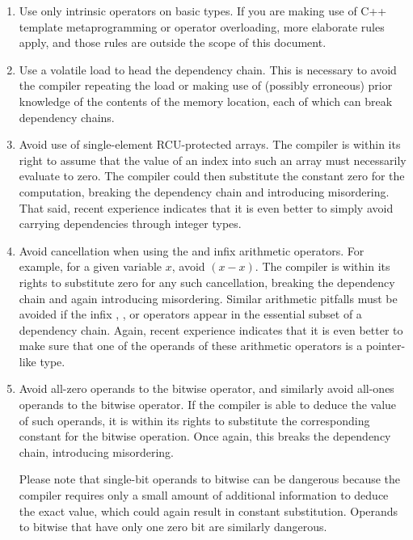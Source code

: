 \documentclass[letterpaper,twocolumn,10pt]{article}
\begin{document}
\begin{enumerate}
\item	Use only intrinsic operators on basic types.
	If you are making use of C++ template metaprogramming or
	operator overloading, more elaborate rules apply, and those
	rules are outside the scope of this document.
\item	Use a volatile load to head the dependency chain.
	This is necessary to avoid the compiler repeating
	the load or making use of (possibly erroneous) prior
	knowledge of the contents of the memory location,
	each of which can break dependency chains.
\item	Avoid use of single-element RCU-protected arrays.
	The compiler is within its right to assume that the
	value of an index into such an array must necessarily evaluate
	to zero.
	The compiler could then substitute the constant zero for
	the computation, breaking the dependency chain and introducing
	misordering.
	That said, recent experience indicates that it is even better
	to simply avoid carrying dependencies through integer types.
\item	Avoid cancellation when using the \co{+} and \co{-} infix
	arithmetic operators.
	For example, for a given variable $x$, avoid $(x-x)$.
	The compiler is within its rights to substitute zero for any
	such cancellation, breaking the dependency chain and again
	introducing misordering.
	Similar arithmetic pitfalls must be avoided if the
	infix \co{*}, \co{/}, or \co{\%} operators appear in
	the essential subset of a dependency chain.
	Again, recent experience indicates that it is even better
	to make sure that one of the operands of these arithmetic
	operators is a pointer-like type.
\item	Avoid all-zero operands to the bitwise \co{&} operator, and similarly
	avoid all-ones operands to the bitwise \co{|} operator.
	If the compiler is able to deduce the value of such operands,
	it is within its rights to substitute the corresponding constant
	for the bitwise operation.
	Once again, this breaks the dependency chain, introducing
	misordering.

	Please note that single-bit operands to bitwise \co{&} can
	be dangerous because the compiler requires only a small
	amount of additional information to deduce the exact value,
	which could again result in constant substitution.
	Operands to bitwise \co{|} that have only one zero bit are
	similarly dangerous.


\end{enumerate}
\end{document}
